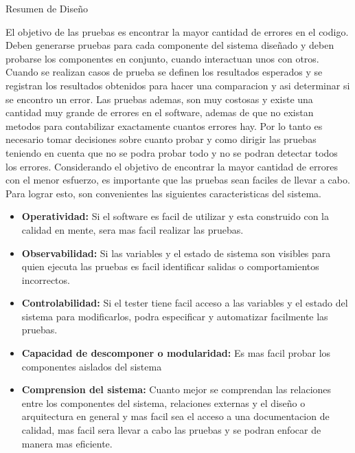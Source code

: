 \documentclass[a4paper]{article}
\begin{document}
\begin{center}\huge{Resumen de Diseño}\end{center}
El objetivo de las pruebas es encontrar la mayor cantidad de errores
en el codigo. Deben generarse pruebas para cada componente del sistema
diseñado y deben probarse los componentes en conjunto, cuando interactuan
unos con otros. Cuando se realizan casos de prueba se definen los 
resultados esperados y se registran los resultados obtenidos para hacer una
comparacion y asi determinar si se encontro un error.
Las pruebas ademas, son muy costosas y existe una cantidad muy grande de 
errores en el software, ademas de que no existan metodos para contabilizar
exactamente cuantos errores hay. Por lo tanto es necesario tomar decisiones
sobre cuanto probar y como dirigir las pruebas teniendo en cuenta que no 
se podra probar todo y no se podran detectar todos los errores.
Considerando el objetivo de encontrar la mayor cantidad de errores con
el menor esfuerzo, es importante que las pruebas sean faciles de llevar
a cabo. Para lograr esto, son convenientes las siguientes caracteristicas
del sistema.

\begin{itemize}
    \item \textbf{Operatividad:} Si el software es facil de utilizar y esta construido
    con la calidad en mente, sera mas facil realizar las pruebas.
    \item \textbf{Observabilidad:} Si las variables y el estado de sistema son visibles
    para quien ejecuta las pruebas es facil identificar salidas o comportamientos incorrectos.
    \item \textbf{Controlabilidad:} Si el tester tiene facil acceso a las variables y el estado
    del sistema para modificarlos, podra especificar y automatizar facilmente las pruebas.
    \item \textbf{Capacidad de descomponer o modularidad:} Es mas facil probar los componentes 
    aislados del sistema
    \item \textbf{Comprension del sistema:} Cuanto mejor se comprendan las relaciones entre los
    componentes del sistema, relaciones externas y el diseño o arquitectura en general y mas
    facil sea el acceso a una documentacion de calidad, mas facil
    sera llevar a cabo las pruebas y se podran enfocar de manera mas eficiente.
\end{itemize}
\end{document}

